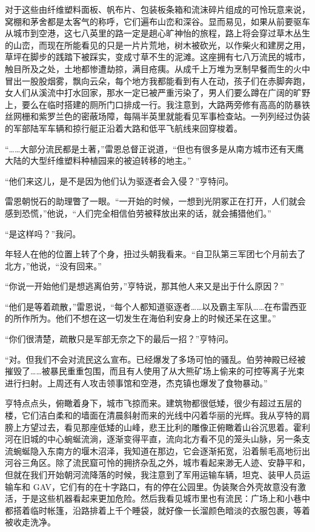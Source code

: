 \documentclass[AutoFakeBold=true]{book}
\begin{document}
对于这些由纤维塑料面板、帆布片、包装板条箱和流沫碎片组成的可怜玩意来说，窝棚和茅舍都是太客气的称呼，它们遍布山峦和深谷。显而易见，如果从前要驱车从城市到空港，这七八英里的路一定是趟心旷神怡的旅程，路上将会穿过草木丛生的山峦，而现在所能看见的只是一片片荒地，树木被砍光，以作柴火和建房之用，草坪在脚步的践踏下被踩实，变成寸草不生的泥滩。这座拥有七八万流民的城市，触目所及之处，土地都惨遭劫掠，满目疮痍。从成千上万堆为烹制早餐而生的火中冒出一股股烟雾，飘向云朵，每个地方我都能看到有人在动，孩子们在赤脚奔跑，女人们从溪流中打水回家，那水一定已被严重污染了，男人们要么蹲在广阔的旷野上，要么在临时搭建的厕所门口排成一行。我注意到，大路两旁修有高高的防暴铁丝网栅和紫罗兰色的密蔽场障，每隔半英里就能看见军事检查站。一列列经过伪装的军部陆军车辆和掠行艇正沿着大路和低平飞航线来回穿梭着。

``……大部分流民都是土著，''雷恩总督正说道，``但也有很多是从南方城市还有天鹰大陆的大型纤维塑料种植园来的被迫转移的地主。''

``他们来这儿，是不是因为他们认为驱逐者会入侵？''亨特问。

雷恩朝悦石的助理瞥了一眼。``一开始的时候，一想到光阴冢正在打开，人们就会感到恐慌，''他说，``人们完全相信伯劳被释放出来的话，就会捕猎他们。''

``是这样吗？''我问。

年轻人在他的位置上转了个身，扭过头朝我看来。``自卫队第三军团七个月前去了北方，''他说，``没有回来。''

``你说{\kaishu 一开始}他们是想逃离伯劳，''亨特说，那其他人来又是出于什么原因？''

``他们是等着疏散，''雷恩说，``每个人都知道驱逐者……以及霸主军队……在布雷西亚的所作所为。他们不想在这一切发生在海伯利安身上的时候还呆在这里。''

``你们很清楚，疏散只是军部无奈之下的最后一招？''亨特问。

``对。但我们不会对流民这么宣布。已经爆发了多场可怕的骚乱。伯劳神殿已经被摧毁了……被暴民重重包围，而且有人使用了从大熊矿场上偷来的可控等离子光束进行扫射。上周还有人攻击领事馆和空港，杰克镇也爆发了食物暴动。''

亨特点点头，俯瞰着身下，城市飞掠而来。建筑物都很低矮，很少有超过五层的楼，它们洁白柔和的墙面在清晨斜射而来的光线中闪着华丽的光辉。我从亨特的肩膀上方望过去，看见那座低矮的山峰，悲王比利的雕像正俯瞰着山谷沉思着。霍利河在旧城的中心蜿蜒流淌，逐渐变得平直，流向北方看不见的笼头山脉，另一条支流蜿蜒隐入东南方的堰木沼泽，我知道在那边，它会逐渐拓宽，沿着鬃毛高地衍出河谷三角区。除了流民窟可怜的拥挤杂乱之外，城市看起来渺无人迹、安静平和，但就在我们开始朝河流降落的时候，我注意到了军用运输车辆，坦克、装甲人员运输车和 GAV，它们有的在十字路口，有的停在公园里。伪装聚合外壳故意没有激活，于是这些机器看起来更加危险。然后我看见城市里也有流民：广场上和小巷中都搭着临时帐篷，沿路排着上千个睡袋，就好像一长溜颜色暗淡的衣服包裹，等着被收走洗净。
\end{document}
